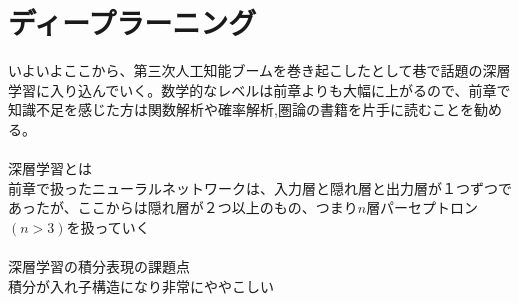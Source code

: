 \documentclass{jsarticle}
\begin{document}
\section{ディープラーニング}
いよいよここから、第三次人工知能ブームを巻き起こしたとして巷で話題の深層学習に入り込んでいく。数学的なレベルは前章よりも大幅に上がるので、前章で知識不足を感じた方は関数解析や確率解析,圏論の書籍を片手に読むことを勧める。\\
　\\
深層学習とは\\
前章で扱ったニューラルネットワークは、入力層と隠れ層と出力層が１つずつであったが、ここからは隠れ層が２つ以上のもの、つまり$n$層パーセプトロン$(n>3)$を扱っていく\\
　\\
深層学習の積分表現の課題点\\
積分が入れ子構造になり非常にややこしい\\
 
\end{document}
